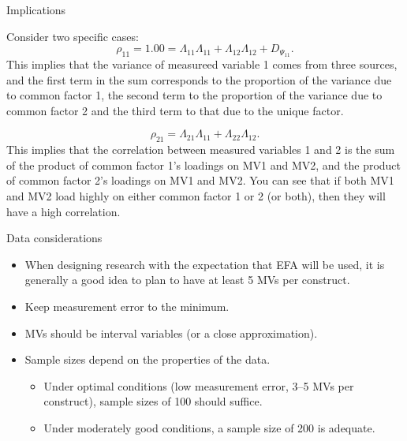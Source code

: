 \documentclass[10pt,ignorenonframetext,]{beamer}
\providecommand{\tightlist}{%
\setlength{\itemsep}{0pt}\setlength{\parskip}{0pt}}
\begin{document}
\begin{frame}{Implications}

Consider two specific cases: \[
\rho_{11} = 1.00 = \Lambda_{11}\Lambda_{11} + \Lambda_{12}\Lambda_{12} + D_{\Psi_{11}}.
\] This implies that the variance of measureed variable 1 comes from
three sources, and the first term in the sum corresponds to the
proportion of the variance due to common factor 1, the second term to
the proportion of the variance due to common factor 2 and the third term
to that due to the unique factor.

\[
\rho_{21} = \Lambda_{21}\Lambda_{11} + \Lambda_{22}\Lambda_{12}.
\] This implies that the correlation between measured variables 1 and 2
is the sum of the product of common factor 1's loadings on MV1 and MV2,
and the product of common factor 2's loadings on MV1 and MV2. You can
see that if both MV1 and MV2 load highly on either common factor 1 or 2
(or both), then they will have a high correlation.

\end{frame}

\begin{frame}{Data considerations}

\begin{itemize}
\tightlist
\item
  When designing research with the expectation that EFA will be used, it
  is generally a good idea to plan to have at least 5 MVs per
  construct.\\
\item
  Keep measurement error to the minimum.
\item
  MVs should be interval variables (or a close approximation).
\item
  Sample sizes depend on the properties of the data.

  \begin{itemize}
  \tightlist
  \item
    Under optimal conditions (low measurement error, 3--5 MVs per
    construct), sample sizes of 100 should suffice.
  \item
    Under moderately good conditions, a sample size of 200 is adequate.
  \end{itemize}
\end{itemize}

\end{frame}
\end{document}
